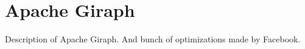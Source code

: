 \section{Apache Giraph}
\label{sec:giraph}

Description of Apache Giraph\cite{giraph}.
And bunch of optimizations made by Facebook\cite{Ching:2015:OTE:2824032.2824077}.


